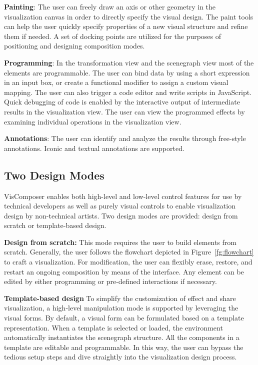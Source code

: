 \noindent \textbf{Painting}: The user can freely draw an axis or other geometry in the visualization canvas in order to directly specify the visual design. The paint tools can help the user quickly specify properties of a new visual structure and refine them if needed. A set of docking points are utilized for the purposes of positioning and designing composition modes.

\noindent \textbf{Programming}: In the transformation view and the scenegraph view most of the elements are programmable. The user can bind data by using a short expression in an input box, or create a functional modifier to assign a custom visual mapping. The user can also trigger a code editor and write scripts in JavaScript. Quick debugging of code is enabled by the interactive output of intermediate results in the visualization view. The user can view the programmed effects by examining individual operations in the visualization view.

\noindent \textbf{Annotations}: The user can identify and analyze the results through free-style annotations. Iconic and textual annotations are supported.

\subsection{Two Design Modes}
VisComposer enables both high-level and low-level control features for use by technical developers as well as purely visual controls to enable visualization design by non-technical artists. Two design modes are provided: design from scratch or template-based design.

\noindent \textbf{Design from scratch:} This mode requires the user to build elements from scratch. Generally, the user follows the flowchart depicted in Figure~\ref{fg:flowchart} to craft a visualization. For modification, the user can flexibly erase, restore, and restart an ongoing composition by means of the interface. Any element can be edited by either programming or pre-defined interactions if necessary.

\noindent \textbf{Template-based design} To simplify the customization of effect and share visualization, a high-level manipulation mode is supported by leveraging the visual forms. By default, a visual form can be formulated based on a template representation. When a template is selected or loaded, the environment automatically instantiates the scenegraph structure. All the components in a template are editable and programmable. In this way, the user can bypass the tedious setup steps and dive straightly into the visualization design process.


